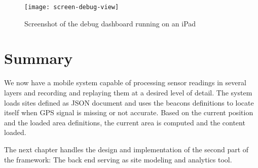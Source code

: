\begin{figure}[H]
\centering
\texttt{[image: screen-debug-view]}
\caption{Screenshot of the debug dashboard running on an iPad}
\label{fig:couchbase-query}
\end{figure}

\section{Summary}

We now have a mobile system capable of processing sensor readings in several layers and recording and replaying them at a desired level of detail. 
The system loads sites defined as JSON document and uses the beacons definitions to locate itself when GPS signal is missing or not accurate. Based on the current position and the loaded area definitions, the current area is computed and the content loaded.

The next chapter handles the design and implementation of the second part of the framework: The back end serving as site modeling and analytics tool.